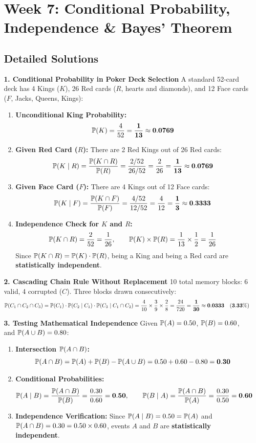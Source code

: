 \section*{Week 7: Conditional Probability, Independence \& Bayes' Theorem}

\subsection*{Detailed Solutions}

\textbf{1. Conditional Probability in Poker Deck Selection}
A standard 52-card deck has 4 Kings ($K$), 26 Red cards ($R$, hearts and diamonds), and 12 Face cards ($F$, Jacks, Queens, Kings):
\begin{enumerate}
    \item \textbf{Unconditional King Probability:}
    $$\P(K) = \frac{4}{52} = \mathbf{\frac{1}{13} \approx 0.0769}$$
    \item \textbf{Given Red Card ($R$):} There are 2 Red Kings out of 26 Red cards:
    $$\P(K \mid R) = \frac{\P(K \cap R)}{\P(R)} = \frac{2/52}{26/52} = \frac{2}{26} = \mathbf{\frac{1}{13} \approx 0.0769}$$
    \item \textbf{Given Face Card ($F$):} There are 4 Kings out of 12 Face cards:
    $$\P(K \mid F) = \frac{\P(K \cap F)}{\P(F)} = \frac{4/52}{12/52} = \frac{4}{12} = \mathbf{\frac{1}{3} \approx 0.3333}$$
    \item \textbf{Independence Check for $K$ and $R$:}
    $$\P(K \cap R) = \frac{2}{52} = \frac{1}{26}, \qquad \P(K) \times \P(R) = \frac{1}{13} \times \frac{1}{2} = \frac{1}{26}$$
    Since $\P(K \cap R) = \P(K) \cdot \P(R)$, being a King and being a Red card are \textbf{statistically independent}.
\end{enumerate}

\textbf{2. Cascading Chain Rule Without Replacement}
10 total memory blocks: 6 valid, 4 corrupted ($C$). Three blocks drawn consecutively:
$$\P(C_1 \cap C_2 \cap C_3) = \P(C_1) \cdot \P(C_2 \mid C_1) \cdot \P(C_3 \mid C_1 \cap C_2) = \frac{4}{10} \times \frac{3}{9} \times \frac{2}{8} = \frac{24}{720} = \mathbf{\frac{1}{30} \approx 0.0333 \quad (3.33\%)}$$

\textbf{3. Testing Mathematical Independence}
Given $\P(A) = 0.50$, $\P(B) = 0.60$, and $\P(A \cup B) = 0.80$:
\begin{enumerate}
    \item \textbf{Intersection $\P(A \cap B)$:}
    $$\P(A \cap B) = \P(A) + \P(B) - \P(A \cup B) = 0.50 + 0.60 - 0.80 = \mathbf{0.30}$$
    \item \textbf{Conditional Probabilities:}
    $$\P(A \mid B) = \frac{\P(A \cap B)}{\P(B)} = \frac{0.30}{0.60} = \mathbf{0.50}, \qquad \P(B \mid A) = \frac{\P(A \cap B)}{\P(A)} = \frac{0.30}{0.50} = \mathbf{0.60}$$
    \item \textbf{Independence Verification:} Since $\P(A \mid B) = 0.50 = \P(A)$ and $\P(A \cap B) = 0.30 = 0.50 \times 0.60$, events $A$ and $B$ are \textbf{statistically independent}.
\end{enumerate}

